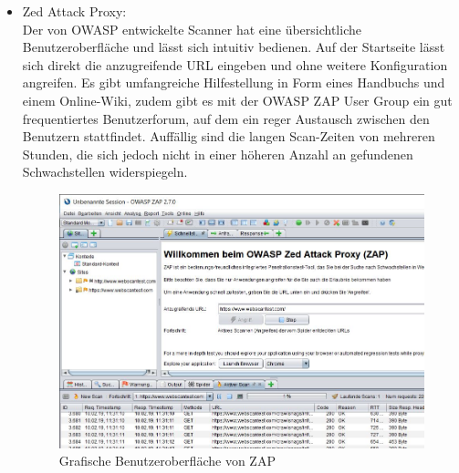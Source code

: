 \documentclass[12pt,oneside,a4paper,parskip]{scrbook}
\begin{document}
\begin{itemize}
          \item Zed Attack Proxy:\\
            Der von OWASP entwickelte Scanner hat eine übersichtliche Benutzeroberfläche und lässt sich intuitiv bedienen. Auf der Startseite lässt sich direkt die anzugreifende URL eingeben und ohne weitere Konfiguration angreifen. Es gibt umfangreiche Hilfestellung in Form eines Handbuchs und einem Online-Wiki, zudem gibt es mit der OWASP ZAP User Group ein gut frequentiertes Benutzerforum, auf dem ein reger Austausch zwischen den Benutzern stattfindet.
            Auffällig sind die langen Scan-Zeiten von mehreren Stunden, die sich jedoch nicht in einer höheren Anzahl an gefundenen Schwachstellen widerspiegeln.
          \begin{figure}[H]
            \includegraphics[width=1\textwidth]{Images/ZAP}
            \caption[Grafische Benutzeroberfläche von ZAP]{Grafische Benutzeroberfläche von ZAP}
          \end{figure}
        \end{itemize}
\end{document}
